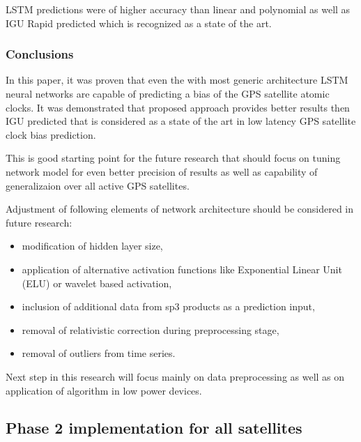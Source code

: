 LSTM predictions were of higher accuracy than linear and polynomial as well as IGU Rapid
predicted which is recognized as a state of the art.


\subsubsection{Conclusions}
In this paper, it was proven that even the with most generic architecture LSTM neural networks are
capable of predicting a bias of the GPS satellite atomic clocks.
It was demonstrated that proposed approach provides better results then IGU predicted 
that is considered as a state of the art in low latency GPS satellite clock bias prediction.

This is good starting point for the future research that should focus on tuning network model for
even better precision of results as well as capability of generalizaion over all active GPS 
satellites.

Adjustment of following elements of network architecture should be considered in future research:
\begin{itemize}
	\item modification of hidden layer size,
	\item application of alternative activation functions like Exponential Linear Unit (ELU)
		or wavelet based activation,
	\item inclusion of additional data from sp3 products as a prediction input,
	\item removal of relativistic correction during preprocessing stage,
	\item removal of outliers from time series.
\end{itemize}

Next step in this research will focus mainly on data preprocessing  as well as on 
application of algorithm in low power devices.

\subsection{Phase 2 implementation for all satellites}
